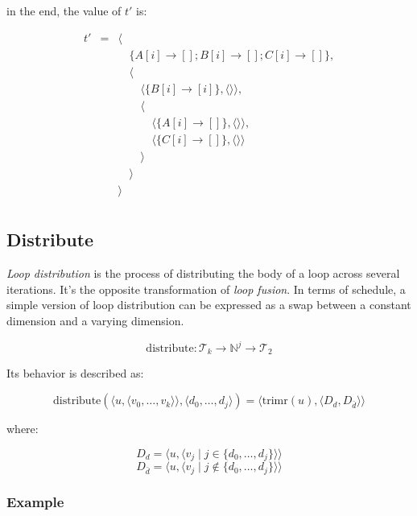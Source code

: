 \documentclass{article}
\begin{document}
\noindent in the end, the value of $t'$ is:

\[
    \begin{array}{lcl}
        t'&=& \langle \\
          & & \quad\{A[i] \rightarrow []; B[i] \rightarrow []; C[i] \rightarrow []  \},\\
          & & \quad\langle \\
          & & \quad\quad \langle\{ B[i] \rightarrow [i] \}, \langle\rangle\rangle,\\
          & & \quad\quad\langle\\
          & & \quad\quad\quad\langle\{ A[i] \rightarrow [] \}, \langle\rangle\rangle, \\
          & & \quad\quad\quad\langle\{ C[i] \rightarrow [] \}, \langle\rangle\rangle \\
          & & \quad\quad\rangle\\
          & & \quad\rangle \\
          & & \rangle \\
    \end{array}
\]


\subsection{Distribute}

\emph{Loop distribution} is the process of distributing the body of a loop
across several iterations. It's the opposite transformation of \emph{loop
fusion}. In terms of schedule, a simple version of loop distribution can be
expressed as a swap between a constant dimension and a varying dimension.

\[
    \mathrm{distribute}: \mathcal{T}_k \rightarrow \mathbb{N}^j \rightarrow \mathcal{T}_{2}
\]

Its behavior is described as:

\[
    \mathrm{distribute}(\langle  u, \langle v_0, \ldots, v_k\rangle \rangle, \langle d_0, \ldots, d_j\rangle) = \langle \mathrm{trimr}(u), \langle D_d, D_{\bar{d}} \rangle \rangle
\]

\noindent where:

\[
    D_d = \langle u, \langle v_j \mid j \in \{ d_0, \ldots, d_j\}\rangle \rangle
\]
\[
    D_{\bar{d}} = \langle u, \langle v_j \mid j \not\in \{ d_0, \ldots, d_j\}\rangle \rangle
\]

\subsubsection*{Example}
\end{document}
